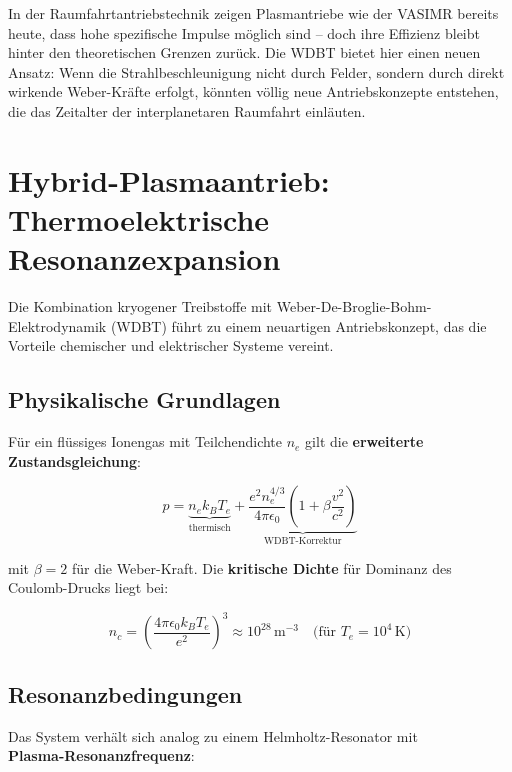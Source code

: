 In der Raumfahrtantriebstechnik zeigen Plasmantriebe wie der VASIMR bereits heute, dass hohe spezifische Impulse möglich sind – doch ihre Effizienz bleibt hinter den theoretischen
Grenzen zurück. Die WDBT bietet hier einen neuen Ansatz: Wenn die Strahlbeschleunigung nicht durch Felder, sondern durch direkt wirkende Weber-Kräfte erfolgt, könnten völlig neue
Antriebskonzepte entstehen, die das Zeitalter der interplanetaren Raumfahrt einläuten.

\section{Hybrid-Plasmaantrieb: Thermoelektrische Resonanzexpansion}
\label{sec:hybrid_antrieb}

Die Kombination kryogener Treibstoffe mit Weber-De-Broglie-Bohm-Elektrodynamik (WDBT) führt zu einem neuartigen Antriebskonzept, das die Vorteile chemischer und elektrischer Systeme vereint.

\subsection{Physikalische Grundlagen}
\label{subsec:grundlagen}

Für ein flüssiges Ionengas mit Teilchendichte $n_e$ gilt die \textbf{erweiterte Zustandsgleichung}:

\begin{equation}
p = \underbrace{n_e k_B T_e}_{\text{thermisch}} 
+ \underbrace{\frac{e^2 n_e^{4/3}}{4\pi \epsilon_0} \left(1 + \beta \frac{v^2}{c^2}\right)}_{\text{WDBT-Korrektur}}
\label{eq:druck}
\end{equation}

mit $\beta = 2$ für die Weber-Kraft. Die \textbf{kritische Dichte} für Dominanz des Coulomb-Drucks liegt bei:

\begin{equation}
n_c = \left(\frac{4\pi \epsilon_0 k_B T_e}{e^2}\right)^3 \approx 10^{28}\,\text{m}^{-3}\quad\text{(für }T_e=10^4\,\text{K)}
\end{equation}

\subsection{Resonanzbedingungen}
\label{subsec:resonanz}

Das System verhält sich analog zu einem Helmholtz-Resonator mit\\\textbf{Plasma-Resonanzfrequenz}:

